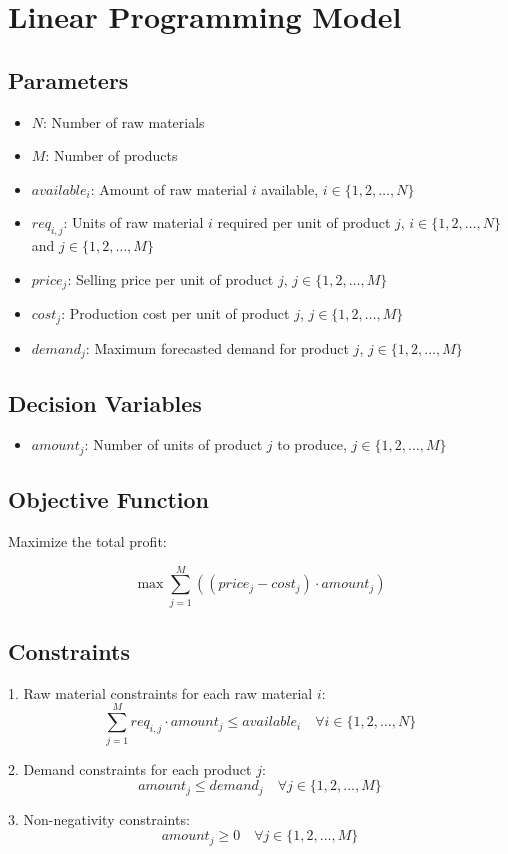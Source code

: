 \documentclass{article}
\begin{document}
\section*{Linear Programming Model}

\subsection*{Parameters}

\begin{itemize}
    \item $N$: Number of raw materials
    \item $M$: Number of products
    \item $available_i$: Amount of raw material $i$ available, $i \in \{1, 2, \ldots, N\}$
    \item $req_{i,j}$: Units of raw material $i$ required per unit of product $j$, $i \in \{1, 2, \ldots, N\}$ and $j \in \{1, 2, \ldots, M\}$
    \item $price_j$: Selling price per unit of product $j$, $j \in \{1, 2, \ldots, M\}$
    \item $cost_j$: Production cost per unit of product $j$, $j \in \{1, 2, \ldots, M\}$
    \item $demand_j$: Maximum forecasted demand for product $j$, $j \in \{1, 2, \ldots, M\}$
\end{itemize}

\subsection*{Decision Variables}

\begin{itemize}
    \item $amount_j$: Number of units of product $j$ to produce, $j \in \{1, 2, \ldots, M\}$
\end{itemize}

\subsection*{Objective Function}

Maximize the total profit:

\[
\max \sum_{j=1}^{M} \left((price_j - cost_j) \cdot amount_j \right)
\]

\subsection*{Constraints}

1. Raw material constraints for each raw material $i$:
   \[
   \sum_{j=1}^{M} req_{i,j} \cdot amount_j \leq available_i \quad \forall i \in \{1, 2, \ldots, N\}
   \]

2. Demand constraints for each product $j$:
   \[
   amount_j \leq demand_j \quad \forall j \in \{1, 2, \ldots, M\}
   \]

3. Non-negativity constraints:
   \[
   amount_j \geq 0 \quad \forall j \in \{1, 2, \ldots, M\}
   \]
\end{document}
